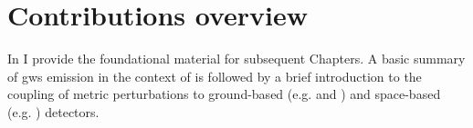 \chapter*{Contributions overview}
\label{Contributions overview} 

In  I provide the foundational material for subsequent Chapters.
A basic summary of \acp{gw} emission in the context of \gr is followed by a brief introduction to the coupling of metric perturbations to ground-based (e.g. \ligo and \virgo) and space-based (e.g. \lisa) detectors.
